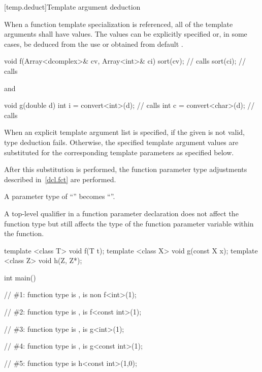 [temp.deduct]{Template argument deduction}

\pnum
When a
function template
specialization is referenced, all of the
template arguments shall have values.
The values can be
explicitly specified or, in some cases, be deduced from the use
or obtained from default
.
\begin{example}
\begin{codeblock}
void f(Array<dcomplex>& cv, Array<int>& ci) {
  sort(cv);                     // calls 
  sort(ci);                     // calls 
}
\end{codeblock}
and
\begin{codeblock}
void g(double d) {
  int i = convert<int>(d);      // calls 
  int c = convert<char>(d);     // calls 
}
\end{codeblock}
\end{example}

\pnum
When an explicit template argument list is specified, if the
given  is not valid,
type deduction fails.
Otherwise, the specified template argument values are substituted for the
corresponding template parameters as specified below.

\pnum
After this substitution is performed, the function parameter type
adjustments described in~\ref{dcl.fct} are performed.
\begin{example}
A parameter type of ``'' becomes
``''.
\end{example}
\begin{note}
A top-level qualifier in a function parameter declaration does not affect
the function type but still affects the type of the function parameter
variable within the function.
\end{note}
\begin{example}
\begin{codeblock}
template <class T> void f(T t);
template <class X> void g(const X x);
template <class Z> void h(Z, Z*);

int main() {
  // \#1: function type is ,  is non 
  f<int>(1);

  // \#2: function type is ,  is 
  f<const int>(1);

  // \#3: function type is ,  is 
  g<int>(1);

  // \#4: function type is ,  is 
  g<const int>(1);

  // \#5: function type is 
  h<const int>(1,0);
}
\end{codeblock}
\end{example}

